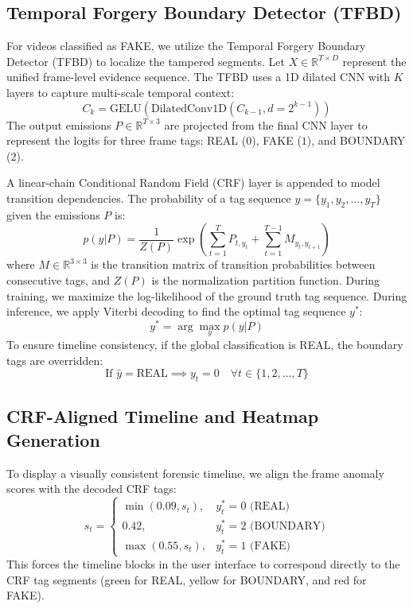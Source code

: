\documentclass[journal,10pt,onecolumn,draftclsnofoot]{IEEEtran}
\begin{document}
\subsection{Temporal Forgery Boundary Detector (TFBD)}
For videos classified as FAKE, we utilize the Temporal Forgery Boundary Detector (TFBD) to localize the tampered segments. Let $X \in \mathbb{R}^{T \times D}$ represent the unified frame-level evidence sequence. The TFBD uses a 1D dilated CNN with $K$ layers to capture multi-scale temporal context:
\begin{equation}
    C_k = \text{GELU}(\text{DilatedConv1D}(C_{k-1}, d = 2^{k-1}))
\end{equation}
The output emissions $P \in \mathbb{R}^{T \times 3}$ are projected from the final CNN layer to represent the logits for three frame tags: REAL ($0$), FAKE ($1$), and BOUNDARY ($2$).

A linear-chain Conditional Random Field (CRF) layer is appended to model transition dependencies. The probability of a tag sequence $y = \{y_1, y_2, \dots, y_T\}$ given the emissions $P$ is:
\begin{equation}
    p(y|P) = \frac{1}{Z(P)} \exp \left( \sum_{t=1}^T P_{t, y_t} + \sum_{t=1}^{T-1} M_{y_t, y_{t+1}} \right)
\end{equation}
where $M \in \mathbb{R}^{3 \times 3}$ is the transition matrix of transition probabilities between consecutive tags, and $Z(P)$ is the normalization partition function. During training, we maximize the log-likelihood of the ground truth tag sequence. During inference, we apply Viterbi decoding to find the optimal tag sequence $y^*$:
\begin{equation}
    y^* = \arg\max_{y} p(y|P)
\end{equation}
To ensure timeline consistency, if the global classification is REAL, the boundary tags are overridden:
\begin{equation}
    \text{If } \hat{y} = \text{REAL} \implies y_t = 0 \quad \forall t \in \{1, 2, \dots, T\}
\end{equation}

\subsection{CRF-Aligned Timeline and Heatmap Generation}
To display a visually consistent forensic timeline, we align the frame anomaly scores with the decoded CRF tags:
\begin{equation}
    s_t = \begin{cases}
        \min(0.09, s_t), & y^*_t = 0 \text{ (REAL)} \\
        0.42, & y^*_t = 2 \text{ (BOUNDARY)} \\
        \max(0.55, s_t), & y^*_t = 1 \text{ (FAKE)}
    \end{cases}
\end{equation}
This forces the timeline blocks in the user interface to correspond directly to the CRF tag segments (green for REAL, yellow for BOUNDARY, and red for FAKE).
\end{document}

